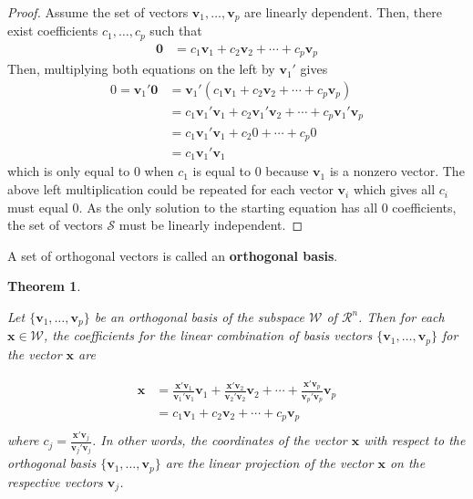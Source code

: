 \documentclass[
]{book}
\newtheorem{theorem}{Theorem}[chapter]
\theoremstyle{definition}
\theoremstyle{definition}
\theoremstyle{definition}
\theoremstyle{remark}
\begin{document}
\begin{proof}

Assume the set of vectors \(\mathbf{v}_1, \ldots, \mathbf{v}_p\) are linearly dependent. Then, there exist coefficients \(c_1, \ldots, c_p\) such that
\[
\begin{aligned}
\mathbf{0} & = c_1 \mathbf{v}_1 + c_2 \mathbf{v}_2 + \cdots + c_p \mathbf{v}_p 
\end{aligned}
\]
Then, multiplying both equations on the left by \(\mathbf{v}_1'\) gives
\[
\begin{aligned}
0 = \mathbf{v}_1' \mathbf{0} & = \mathbf{v}_1' (c_1 \mathbf{v}_1 + c_2 \mathbf{v}_2 + \cdots + c_p \mathbf{v}_p) \\
& = c_1 \mathbf{v}_1' \mathbf{v}_1 + c_2  \mathbf{v}_1' \mathbf{v}_2 + \cdots + c_p  \mathbf{v}_1' \mathbf{v}_p \\
& = c_1 \mathbf{v}_1' \mathbf{v}_1 + c_2  0 + \cdots + c_p 0 \\
& = c_1 \mathbf{v}_1' \mathbf{v}_1
\end{aligned}
\]
which is only equal to 0 when \(c_1\) is equal to 0 because \(\mathbf{v}_1\) is a nonzero vector. The above left multiplication could be repeated for each vector \(\mathbf{v}_i\) which gives all \(c_i\) must equal 0. As the only solution to the starting equation has all 0 coefficients, the set of vectors \(\mathcal{S}\) must be linearly independent.

\end{proof}

A set of orthogonal vectors is called an \textbf{orthogonal basis}.

\begin{theorem}
\protect\hypertarget{thm:unlabeled-div-196}{}\label{thm:unlabeled-div-196}

Let \(\{ \mathbf{v}_1, \ldots, \mathbf{v}_p \}\) be an orthogonal basis of the subspace \(\mathcal{W}\) of \(\mathcal{R}^n\). Then for each \(\mathbf{x} \in \mathcal{W}\), the coefficients for the linear combination of basis vectors \(\{ \mathbf{v}_1, \ldots, \mathbf{v}_p \}\) for the vector \(\mathbf{x}\) are

\[
\begin{aligned}
\mathbf{x} & = \frac{\mathbf{x}'\mathbf{v}_1}{\mathbf{v}_1'\mathbf{v}_1} \mathbf{v}_1 + \frac{\mathbf{x}'\mathbf{v}_2}{\mathbf{v}_2'\mathbf{v}_2} \mathbf{v}_2 + \cdots +  \frac{\mathbf{x}'\mathbf{v}_p}{\mathbf{v}_p'\mathbf{v}_p} \mathbf{v}_p \\
& = c_1 \mathbf{v}_1 + c_2 \mathbf{v}_2 + \cdots + c_p \mathbf{v}_p \\
\end{aligned}
\]
where \(c_j = \frac{\mathbf{x}'\mathbf{v}_j}{\mathbf{v}_j'\mathbf{v}_j}\). In other words, the coordinates of the vector \(\mathbf{x}\) with respect to the orthogonal basis \(\{ \mathbf{v}_1, \ldots, \mathbf{v}_p \}\) are the linear projection of the vector \(\mathbf{x}\) on the respective vectors \(\mathbf{v}_j\).

\end{theorem}
\end{document}

